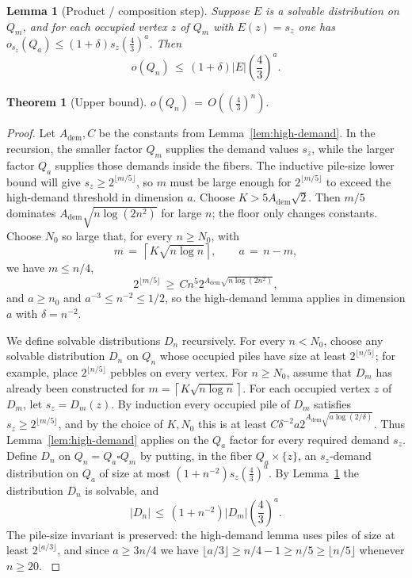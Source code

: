 \documentclass[10pt,a4paper]{amsart}
\newtheorem{lemma}{Lemma}
\newtheorem{theorem}{Theorem}
\newcommand{\Adem}{A_{\mathrm{dem}}}
\begin{document}
\begin{lemma}[Product / composition step]\label{lem:product-step}
Suppose $E$ is a solvable distribution on $Q_m$, and for each occupied vertex $z$ of $Q_m$
with $E(z)=s_z$ one has $o_{s_z}(Q_a)\le (1+\delta)s_z\left(\frac43\right)^a$.  Then
\[
o(Q_n)\,\le\, (1+\delta)|E|\left(\frac43\right)^a.
\]
\end{lemma}

\begin{theorem}[Upper bound]\label{thm:upper}
$o(Q_n)\,=\,O\!\left(\left(\frac43\right)^n\right).$
\end{theorem}

\begin{proof}
Let $\Adem,C$ be the constants from Lemma~\ref{lem:high-demand}. In the recursion, the
smaller factor $Q_m$ supplies the demand values $s_z$, while the larger factor $Q_a$
supplies those demands inside the fibers.  The inductive pile-size lower bound will give
$s_z\ge 2^{\lfloor m/5\rfloor}$, so $m$ must be large enough for
$2^{\lfloor m/5\rfloor}$ to exceed the high-demand threshold in dimension $a$.
Choose $K>5\Adem\sqrt 2$.  Then $m/5$ dominates
$\Adem\sqrt{n\log(2n^2)}$ for large $n$; the floor only changes constants.
Choose $N_0$ so large
that, for every $n\ge N_0$, with
\[
m\,=\,\left\lceil K\sqrt{n\log n}\right\rceil,\qquad a\,=\,n-m,
\]
we have $m\le n/4$,
\[
2^{\lfloor m/5\rfloor}\,\ge\, C n^5 2^{\Adem\sqrt{n\log(2n^2)}},
\]
and $a\ge n_0$ and $a^{-3}\le n^{-2}\le 1/2$, so the high-demand lemma applies in
dimension $a$ with $\delta=n^{-2}$.
\label{def:parameters}

We define solvable distributions $D_n$ recursively.  For every $n<N_0$, choose any
solvable distribution $D_n$ on $Q_n$ whose occupied piles have size at least
$2^{\lfloor n/5\rfloor}$; for example, place $2^{\lfloor n/5\rfloor}$ pebbles on every
vertex.  For $n\ge N_0$, assume
that $D_m$ has already been constructed for
$m=\left\lceil K\sqrt{n\log n}\right\rceil$.
For each occupied vertex $z$ of $D_m$, let $s_z=D_m(z)$.  By induction every occupied
pile of $D_m$ satisfies $s_z\ge 2^{\lfloor m/5\rfloor}$, and by the choice of
$K,N_0$ this is at least $C\delta^{-2}a2^{\Adem\sqrt{a\log(2/\delta)}}$.
Thus Lemma~\ref{lem:high-demand} applies on the $Q_a$ factor for every required demand
$s_z$.  Define $D_n$ on $Q_n=Q_a\square Q_m$ by putting, in the fiber $Q_a\times\{z\}$, an
$s_z$-demand distribution on $Q_a$ of size at most $(1+n^{-2})s_z\left(\frac43\right)^a$.
By Lemma~\ref{lem:product-step} the distribution $D_n$ is solvable, and
\[
|D_n|\,\le\, (1+n^{-2})|D_m|\left(\frac43\right)^a.
\]
The pile-size invariant is preserved: the high-demand lemma uses piles of size at least
$2^{\lfloor a/3\rfloor}$, and since $a\ge 3n/4$ we have
$\lfloor a/3\rfloor\ge n/4-1\ge n/5\ge \lfloor n/5\rfloor$ whenever $n\ge 20$.
\label{lem:recurrence}


\end{proof}
\end{document}
